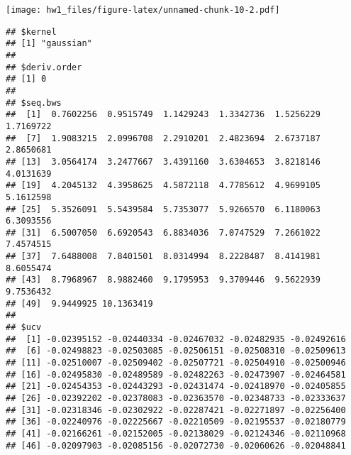 \documentclass[]{article}
\newenvironment{Shaded}{\begin{snugshade}}{\end{snugshade}}
\newcommand{\KeywordTok}[1]{\textcolor[rgb]{0.13,0.29,0.53}{\textbf{#1}}}
\newcommand{\DataTypeTok}[1]{\textcolor[rgb]{0.13,0.29,0.53}{#1}}
\newcommand{\FloatTok}[1]{\textcolor[rgb]{0.00,0.00,0.81}{#1}}
\newcommand{\StringTok}[1]{\textcolor[rgb]{0.31,0.60,0.02}{#1}}
\newcommand{\OperatorTok}[1]{\textcolor[rgb]{0.81,0.36,0.00}{\textbf{#1}}}
\newcommand{\NormalTok}[1]{#1}
\begin{document}
\begin{Shaded}
\end{Shaded}

\texttt{[image: hw1\_files/figure-latex/unnamed-chunk-10-2.pdf]}

\begin{verbatim}
## $kernel
## [1] "gaussian"
## 
## $deriv.order
## [1] 0
## 
## $seq.bws
##  [1]  0.7602256  0.9515749  1.1429243  1.3342736  1.5256229  1.7169722
##  [7]  1.9083215  2.0996708  2.2910201  2.4823694  2.6737187  2.8650681
## [13]  3.0564174  3.2477667  3.4391160  3.6304653  3.8218146  4.0131639
## [19]  4.2045132  4.3958625  4.5872118  4.7785612  4.9699105  5.1612598
## [25]  5.3526091  5.5439584  5.7353077  5.9266570  6.1180063  6.3093556
## [31]  6.5007050  6.6920543  6.8834036  7.0747529  7.2661022  7.4574515
## [37]  7.6488008  7.8401501  8.0314994  8.2228487  8.4141981  8.6055474
## [43]  8.7968967  8.9882460  9.1795953  9.3709446  9.5622939  9.7536432
## [49]  9.9449925 10.1363419
## 
## $ucv
##  [1] -0.02395152 -0.02440334 -0.02467032 -0.02482935 -0.02492616
##  [6] -0.02498823 -0.02503085 -0.02506151 -0.02508310 -0.02509613
## [11] -0.02510007 -0.02509402 -0.02507721 -0.02504910 -0.02500946
## [16] -0.02495830 -0.02489589 -0.02482263 -0.02473907 -0.02464581
## [21] -0.02454353 -0.02443293 -0.02431474 -0.02418970 -0.02405855
## [26] -0.02392202 -0.02378083 -0.02363570 -0.02348733 -0.02333637
## [31] -0.02318346 -0.02302922 -0.02287421 -0.02271897 -0.02256400
## [36] -0.02240976 -0.02225667 -0.02210509 -0.02195537 -0.02180779
## [41] -0.02166261 -0.02152005 -0.02138029 -0.02124346 -0.02110968
## [46] -0.02097903 -0.02085156 -0.02072730 -0.02060626 -0.02048841
\end{verbatim}

\begin{Shaded}
\end{Shaded}
\end{document}
